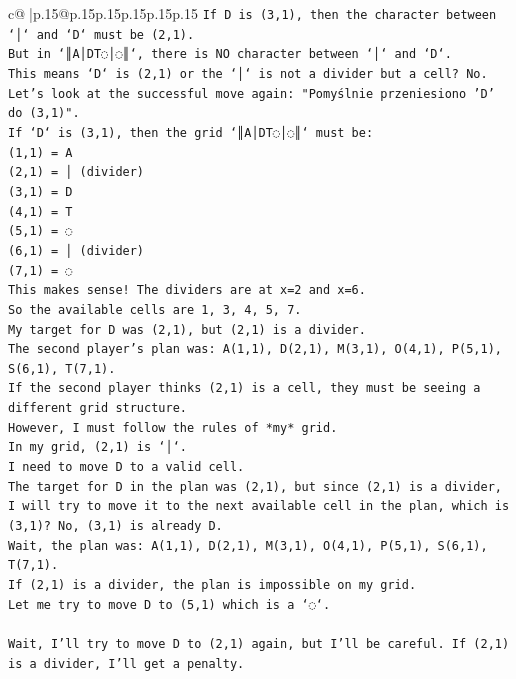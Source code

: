 \documentclass{article}
\begin{document}
{\begin{supertabular}{c@{$\;$}|p{.15\linewidth}@{}p{.15\linewidth}p{.15\linewidth}p{.15\linewidth}p{.15\linewidth}p{.15\linewidth}}
{{{\texttt{If D is (3,1), then the character between `│` and `D` must be (2,1).} \\
\texttt{But in `║A│DT◌│◌║`, there is NO character between `│` and `D`.} \\
\texttt{This means `D` is (2,1) or the `│` is not a divider but a cell? No.} \\
\texttt{Let's look at the successful move again: "Pomyślnie przeniesiono 'D' do (3,1)".} \\
\texttt{If `D` is (3,1), then the grid `║A│DT◌│◌║` must be:} \\
\texttt{(1,1) = A} \\
\texttt{(2,1) = │ (divider)} \\
\texttt{(3,1) = D} \\
\texttt{(4,1) = T} \\
\texttt{(5,1) = ◌} \\
\texttt{(6,1) = │ (divider)} \\
\texttt{(7,1) = ◌} \\
\texttt{This makes sense! The dividers are at x=2 and x=6.} \\
\texttt{So the available cells are 1, 3, 4, 5, 7.} \\
\texttt{My target for D was (2,1), but (2,1) is a divider.} \\
\texttt{The second player's plan was: A(1,1), D(2,1), M(3,1), O(4,1), P(5,1), S(6,1), T(7,1).} \\
\texttt{If the second player thinks (2,1) is a cell, they must be seeing a different grid structure.} \\
\texttt{However, I must follow the rules of *my* grid.} \\
\texttt{In my grid, (2,1) is `│`.} \\
\texttt{I need to move D to a valid cell.} \\
\texttt{The target for D in the plan was (2,1), but since (2,1) is a divider, I will try to move it to the next available cell in the plan, which is (3,1)? No, (3,1) is already D.} \\
\texttt{Wait, the plan was: A(1,1), D(2,1), M(3,1), O(4,1), P(5,1), S(6,1), T(7,1).} \\
\texttt{If (2,1) is a divider, the plan is impossible on my grid.} \\
\texttt{Let me try to move D to (5,1) which is a `◌`.} \\
\\ 
\texttt{Wait, I'll try to move D to (2,1) again, but I'll be careful. If (2,1) is a divider, I'll get a penalty.} \\
}}}
\end{supertabular}}
\end{document}
